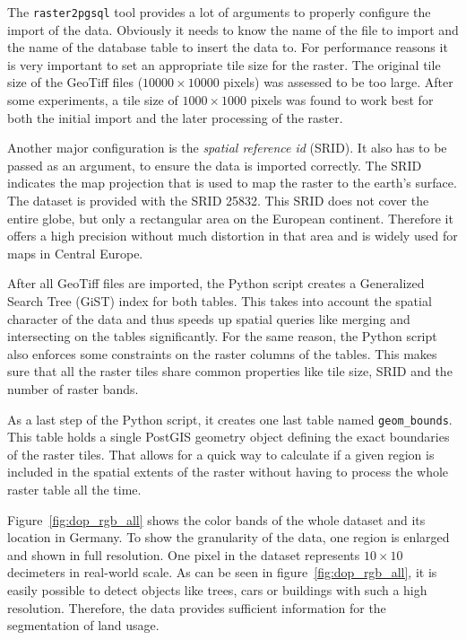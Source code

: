 The \texttt{raster2pgsql} tool provides a lot of arguments to properly configure the import of the data. Obviously it needs to know the name of the file to import and the name of the database table to insert the data to. For performance reasons it is very important to set an appropriate tile size for the raster. The original tile size of the GeoTiff files ($10000\times 10000$ pixels) was assessed to be too large. After some experiments, a tile size of $1000\times 1000$ pixels was found to work best for both the initial import and the later processing of the raster.

Another major configuration is the \emph{spatial reference id} (SRID). It also has to be passed as an argument, to ensure the data is imported correctly. The SRID indicates the map projection that is used to map the raster to the earth's surface. The dataset is provided with the SRID 25832. This SRID does not cover the entire globe, but only a rectangular area on the European continent. Therefore it offers a high precision without much distortion in that area and is widely used for maps in Central Europe.

After all GeoTiff files are imported, the Python script creates a Generalized Search Tree (GiST) index for both tables. This takes into account the spatial character of the data and thus speeds up spatial queries like merging and intersecting on the tables significantly. For the same reason, the Python script also enforces some constraints on the raster columns of the tables. This makes sure that all the raster tiles share common properties like tile size, SRID and the number of raster bands.

As a last step of the Python script, it creates one last table named \texttt{geom\_bounds}. This table holds a single PostGIS geometry object defining the exact boundaries of the raster tiles. That allows for a quick way to calculate if a given region is included in the spatial extents of the raster without having to process the whole raster table all the time.

Figure~\ref{fig:dop_rgb_all} shows the color bands of the whole dataset and its location in Germany. To show the granularity of the data, one region is enlarged and shown in full resolution. One pixel in the dataset represents $10\times 10$ decimeters in real-world scale. As can be seen in figure~\ref{fig:dop_rgb_all}, it is easily possible to detect objects like trees, cars or buildings with such a high resolution. Therefore, the data provides sufficient information for the segmentation of land usage.

